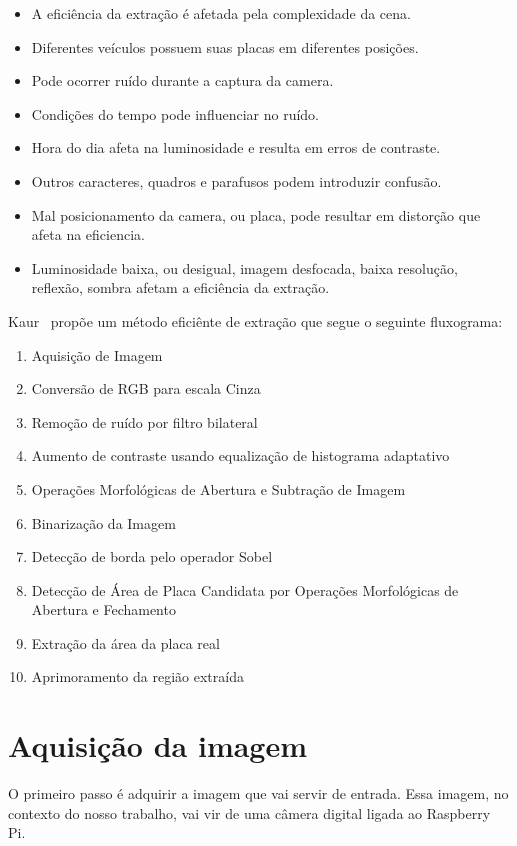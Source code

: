 \begin{itemize}
	\item A eficiência da extração é afetada pela complexidade da cena.
	\item Diferentes veículos possuem suas placas em diferentes posições.
	\item Pode ocorrer ruído durante a captura da camera.
	\item Condições do tempo pode influenciar no ruído.
	\item Hora do dia afeta na luminosidade e resulta em erros de contraste.
	\item Outros caracteres, quadros e parafusos podem introduzir confusão.
	\item Mal posicionamento da camera, ou placa, pode resultar em distorção que afeta na eficiencia.
	\item Luminosidade baixa, ou desigual, imagem desfocada, baixa resolução, reflexão, sombra afetam a eficiência da extração.
\end{itemize}

Kaur~\cite{kaur2014efficient} propõe um método eficiênte de
extração que segue o seguinte fluxograma:

\begin{enumerate}
	\item Aquisição de Imagem
	\item Conversão de RGB para escala Cinza
	\item Remoção de ruído por filtro bilateral
	\item Aumento de contraste usando equalização de histograma adaptativo
	\item Operações Morfológicas de Abertura e Subtração de Imagem
	\item Binarização da Imagem
	\item Detecção de borda pelo operador Sobel
	\item Detecção de Área de Placa Candidata por Operações Morfológicas de Abertura e Fechamento
	\item Extração da área da placa real
	\item Aprimoramento da região extraída
\end{enumerate}

\section{Aquisição da imagem}

O primeiro passo é adquirir a imagem que vai servir de entrada. Essa imagem, no
contexto do nosso trabalho, vai vir de uma câmera digital ligada ao Raspberry
Pi.

